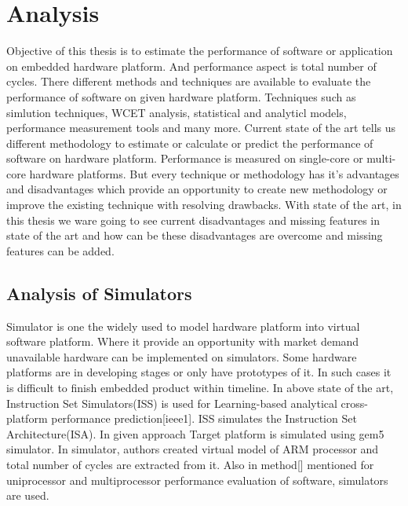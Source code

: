 \setlength{\parindent}{4em}
\setlength{\parskip}{1em}

\section{Analysis}
Objective of this thesis is to estimate the performance of software or application on embedded hardware platform. And  performance aspect is total number of cycles. There different methods and techniques are available to evaluate the performance of software on given hardware platform. Techniques such as simlution techniques, WCET analysis, statistical and analyticl models, performance measurement tools and many more. Current state of the art tells us different methodology to estimate or calculate or predict the performance of software on hardware platform. Performance is measured on single-core or multi-core hardware platforms. But every technique or methodology has it's advantages and disadvantages which provide an opportunity to create new methodology or improve the existing technique with resolving drawbacks. With state of the art, in this thesis we ware going to see current disadvantages and missing features in state of the art and how can be these disadvantages are overcome and missing features can be added. 

\subsection{Analysis of Simulators}
\par Simulator is one the widely used to model hardware platform into virtual software platform. Where it provide an opportunity with market demand unavailable hardware can be implemented on simulators. Some hardware platforms are in developing stages or only have prototypes of it. In such cases it is difficult to finish embedded product within timeline. In above state of the art, Instruction Set Simulators(ISS) is used for Learning-based analytical cross-platform performance prediction[ieee1]. ISS simulates the Instruction Set Architecture(ISA). In given approach Target platform is simulated using gem5 simulator. In simulator, authors created virtual model of ARM processor and total number of cycles are extracted from it. Also in method[] mentioned for uniprocessor and multiprocessor performance evaluation of software, simulators are used. 

